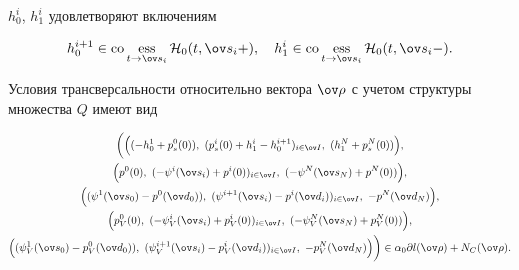 $h_0^i$, $h_1^i$ удовлетворяют включениям


$$


h_0^{i+1}\in \co \ess_{t\rightarrow


\ov s_i}{\cal H}_0(t,\ov s_i+),\quad h_1^{i}\in


\co\ess_{t\rightarrow \ov


s_i}{\cal H}_0(t,\ov s_i-).


$$





Условия трансверсальности относительно вектора $\ov


\rho$ с учетом структуры множества $Q$ имеют вид


\begin{multline}


\label{eq:(5.66)}


\bigg(\Big((-h_0^1+p_s^0(0)),\


(p_s^i(0)+h_1^i-h_0^{i+1})_{i\in


\ov I}, \ (h_1^{N}+p_s^N(0)) \Big), \\


%


\Big( p^0(0), \ (-\psi^i(\ov s_i)+ p^i(0))_{i\in


\ov I}, \ (-\psi^N(\ov s_N)+ p^N(0)) \Big), \\


%


\Big((\psi^1(\ov s_0)- p^0(\ov d_0)), \ (\psi^{i+1}(\ov s_i)-


p^i(\ov d_i))_{i\in \ov I}, \ -p^N(\ov d_N)\Big), \\


%


\Big( p_V^0(0), \ (-\psi_V^i(\ov s_i)+


p_V^i(0))_{i\in \ov I}, \ (-\psi_V^N(\ov s_N)+ p_V^N(0))\Big),\\


%


\Big((\psi_V^1(\ov s_0)-


p_V^0(\ov d_0)), \ (\psi_V^{i+1}(\ov s_i)-


p_V^i(\ov d_i))_{i\in \ov I}, \ -p_V^N(\ov d_N)


\Big) \bigg)


\in \alpha_0\partial l(\ov \rho)+N_C(\ov \rho).


\end{multline}





